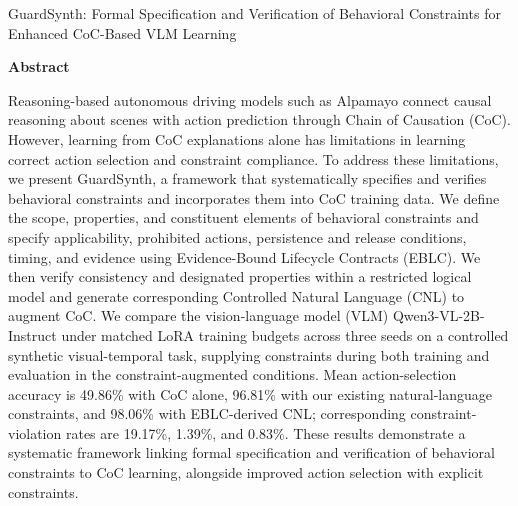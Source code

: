 \documentclass[11pt,a4paper]{article}
\begin{document}
\vspace*{8mm}
{\Large\bfseries\color{navy}\raggedright GuardSynth: Formal Specification and Verification of Behavioral Constraints for Enhanced CoC-Based VLM Learning\par}
\vspace{8mm}
{\large\bfseries Abstract\par}
\vspace{3mm}
Reasoning-based autonomous driving models such as Alpamayo connect causal reasoning about scenes with action prediction through Chain of Causation (CoC). However, learning from CoC explanations alone has limitations in learning correct action selection and constraint compliance. To address these limitations, we present GuardSynth, a framework that systematically specifies and verifies behavioral constraints and incorporates them into CoC training data. We define the scope, properties, and constituent elements of behavioral constraints and specify applicability, prohibited actions, persistence and release conditions, timing, and evidence using Evidence-Bound Lifecycle Contracts (EBLC). We then verify consistency and designated properties within a restricted logical model and generate corresponding Controlled Natural Language (CNL) to augment CoC. We compare the vision-language model (VLM) Qwen3-VL-2B-Instruct under matched LoRA training budgets across three seeds on a controlled synthetic visual-temporal task, supplying constraints during both training and evaluation in the constraint-augmented conditions. Mean action-selection accuracy is 49.86\% with CoC alone, 96.81\% with our existing natural-language constraints, and 98.06\% with EBLC-derived CNL; corresponding constraint-violation rates are 19.17\%, 1.39\%, and 0.83\%. These results demonstrate a systematic framework linking formal specification and verification of behavioral constraints to CoC learning, alongside improved action selection with explicit constraints.
\end{document}
